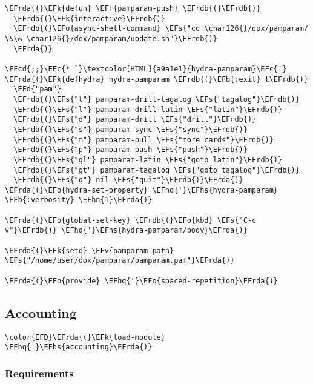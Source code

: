 \documentclass[a4wide,10pt]{article}
\newcommand{\EFc}[1]{\textcolor{EFc}{#1}} %
\newcommand{\EFcd}[1]{\textcolor{EFcd}{#1}} %
\newcommand{\EFs}[1]{\textcolor{EFs}{#1}} %
\newcommand{\EFd}[1]{\textcolor{EFd}{#1}} %
\newcommand{\EFk}[1]{\textcolor{EFk}{#1}} %
\newcommand{\EFb}[1]{\textcolor{EFb}{#1}} %
\newcommand{\EFf}[1]{\textcolor{EFf}{#1}} %
\newcommand{\EFv}[1]{\textcolor{EFv}{#1}} %
\newcommand{\EFo}[1]{\textcolor{EFo}{#1}} %
\newcommand{\EFhn}[1]{\textcolor{EFhn}{\textbf{#1}}} %
\newcommand{\EFhq}[1]{\textcolor{EFhq}{#1}} %
\newcommand{\EFhs}[1]{\textcolor{EFhs}{#1}} %
\newcommand{\EFrda}[1]{\textcolor{EFrda}{#1}} %
\newcommand{\EFrdb}[1]{\textcolor{EFrdb}{#1}} %
\begin{document}
\begin{Code}
\begin{Verbatim}
\EFrda{(}\EFk{defun} \EFf{pamparam-push} \EFrdb{(}\EFrdb{)}
  \EFrdb{(}\EFk{interactive}\EFrdb{)}
  \EFrdb{(}\EFo{async-shell-command} \EFs{"cd \char126{}/dox/pamparam/ \&\& \char126{}/dox/pamparam/update.sh"}\EFrdb{)}
  \EFrda{)}

\EFcd{;;}\EFc{* `}\textcolor[HTML]{a9a1e1}{hydra-pamparam}\EFc{'}
\EFrda{(}\EFk{defhydra} hydra-pamparam \EFrdb{(}\EFb{:exit} t\EFrdb{)}
  \EFd{"pam"}
  \EFrdb{(}\EFs{"t"} pamparam-drill-tagalog \EFs{"tagalog"}\EFrdb{)}
  \EFrdb{(}\EFs{"l"} pamparam-drill-latin \EFs{"latin"}\EFrdb{)}
  \EFrdb{(}\EFs{"d"} pamparam-drill \EFs{"drill"}\EFrdb{)}
  \EFrdb{(}\EFs{"s"} pamparam-sync \EFs{"sync"}\EFrdb{)}
  \EFrdb{(}\EFs{"m"} pamparam-pull \EFs{"more cards"}\EFrdb{)}
  \EFrdb{(}\EFs{"p"} pamparam-push \EFs{"push"}\EFrdb{)}
  \EFrdb{(}\EFs{"gl"} pamparam-latin \EFs{"goto latin"}\EFrdb{)}
  \EFrdb{(}\EFs{"gt"} pamparam-tagalog \EFs{"goto tagalog"}\EFrdb{)}
  \EFrdb{(}\EFs{"q"} nil \EFs{"quit"}\EFrdb{)}\EFrda{)}
\EFrda{(}\EFo{hydra-set-property} \EFhq{'}\EFhs{hydra-pamparam} \EFb{:verbosity} \EFhn{1}\EFrda{)}

\EFrda{(}\EFo{global-set-key} \EFrdb{(}\EFo{kbd} \EFs{"C-c v"}\EFrdb{)} \EFhq{'}\EFhs{hydra-pamparam/body}\EFrda{)}

\EFrda{(}\EFk{setq} \EFv{pamparam-path} \EFs{"/home/user/dox/pamparam/pamparam.pam"}\EFrda{)}

\EFrda{(}\EFo{provide} \EFhq{'}\EFo{spaced-repetition}\EFrda{)}
\end{Verbatim}
\end{Code}

\subsection{Accounting}
\label{sec:org5feea1e}
\begin{Code}
\begin{Verbatim}
\color{EFD}\EFrda{(}\EFk{load-module} \EFhq{'}\EFhs{accounting}\EFrda{)}
\end{Verbatim}
\end{Code}
\subsubsection{Requirements}
\label{sec:org6002c6f}
\end{document}
